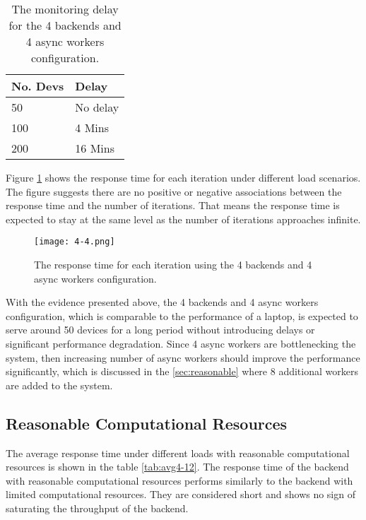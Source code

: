 \documentclass[../thesis.tex]{subfiles}
\begin{document}
\begin{table}[h!]
\begin{center}
\caption{The monitoring delay for the 4 backends and 4 async workers configuration.}
\label{tab:delay4-4}
\begin{tabular}{l|l}
\toprule
\textbf{No. Devs} & \textbf{Delay}\\
\midrule
50 & No delay \\
100 & 4 Mins\\
200 & 16 Mins\\
\bottomrule
\end{tabular}
\end{center}
\end{table}

Figure \ref{fig:4-4} shows the response time for each iteration under different load scenarios. The figure suggests there are no positive or negative associations between the response time and the number of iterations. That means the response time is expected to stay at the same level as the number of iterations approaches infinite.

\begin{figure}[!ht]
\centering
\texttt{[image: 4-4.png]}
\caption{The response time for each iteration using the 4 backends and 4 async workers configuration.}
\label{fig:4-4}
\end{figure}

With the evidence presented above, the 4 backends and 4 async workers configuration, which is comparable to the performance of a laptop, is expected to serve around 50 devices for a long period without introducing delays or significant performance degradation. Since 4 async workers are bottlenecking the system, then increasing number of async workers should improve the performance significantly, which is discussed in the \autoref{sec:reasonable} where 8 additional workers are added to the system.

\subsection{Reasonable Computational Resources}
\label{sec:reasonable}
The average response time under different loads with reasonable computational resources is shown in the table \ref{tab:avg4-12}. The response time of the backend with reasonable computational resources performs similarly to the backend with limited computational resources. They are considered short and shows no sign of saturating the throughput of the backend.
\end{document}
